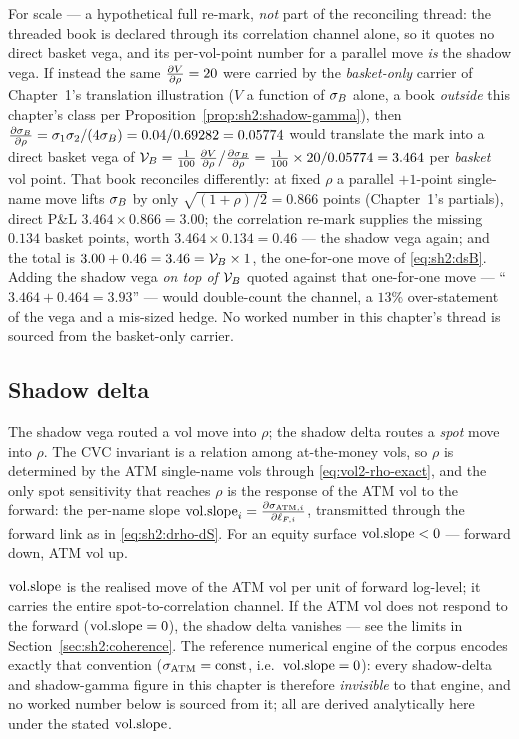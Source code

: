 \begin{example}
For scale --- a hypothetical full re-mark, \emph{not} part of the
reconciling thread: the threaded book is declared through its correlation
channel alone, so it quotes no direct basket vega, and its per-vol-point
number for a parallel move \emph{is} the shadow vega. If instead the same
$\frac{\partial V}{\partial \rho} = 20$ were carried by the \emph{basket-only} carrier of
Chapter~1's translation illustration ($V$ a function of $\sigma_B$ alone, a
book \emph{outside} this chapter's class per
Proposition~\ref{prop:sh2:shadow-gamma}), then
$\frac{\partial \sigma_B}{\partial \rho} = \sigma_1\sigma_2/(4\sigma_B) = 0.04/0.69282 = 0.05774$ would
translate the mark into a direct basket vega of
$\mathcal{V}_B = \tfrac1{100}\,\frac{\partial V}{\partial \rho} \big/ \frac{\partial \sigma_B}{\partial \rho}
     = \tfrac1{100} \times 20 / 0.05774 = 3.464$ per \emph{basket} vol
point. That book reconciles differently: at fixed $\rho$ a parallel
$+1$-point single-name move lifts $\sigma_B$ by only
$\sqrt{(1+\rho)/2} = 0.866$ points (Chapter~1's \stickyrho{} partials),
direct P\&L $3.464 \times 0.866 = 3.00$; the correlation re-mark supplies
the missing $0.134$ basket points, worth $3.464 \times 0.134 = 0.46$ ---
the shadow vega again; and the \stickycvc{} total is
$3.00 + 0.46 = 3.46 = \mathcal{V}_B \times 1$, the one-for-one move of
\eqref{eq:sh2:dsB}. Adding the shadow vega \emph{on top of} $\mathcal{V}_B$ quoted
against that one-for-one move --- ``$3.464 + 0.464 = 3.93$'' --- would
double-count the channel, a $13\%$ over-statement of the vega and a
mis-sized hedge. No worked number in this chapter's thread is sourced
from the basket-only carrier.
\end{example}

\subsection{Shadow delta}\label{sec:sh2:shadow-delta}

The shadow vega routed a vol move into $\rho$; the shadow delta routes a
\emph{spot} move into $\rho$. The CVC invariant is a relation among
at-the-money vols, so $\rho$ is determined by the ATM single-name vols
through \eqref{eq:vol2-rho-exact}, and the only spot sensitivity that
reaches $\rho$ is the response of the ATM vol to the forward: the per-name
slope $\mathrm{vol.slope}_i = \frac{\partial \sigma_{\mathrm{ATM},i}}{\partial \ell_{F,i}}$, transmitted through the
forward link as in \eqref{eq:sh2:drho-dS}. For an equity surface
$\mathrm{vol.slope} < 0$ --- forward down, ATM vol up.

\begin{remark}\label{rem:sh2:slope-input}
$\mathrm{vol.slope}$ is the realised move of the ATM vol per unit of forward
log-level; it carries the entire spot-to-correlation channel. If the ATM
vol does not respond to the forward ($\mathrm{vol.slope} = 0$), the shadow delta
vanishes --- see the limits in Section~\ref{sec:sh2:coherence}. The
reference numerical engine of the corpus encodes exactly that convention
($\sigma_{\mathrm{ATM}} = \text{const}$, i.e.\ $\mathrm{vol.slope} = 0$): every shadow-delta and
shadow-gamma figure in this chapter is therefore \emph{invisible} to that
engine, and no worked number below is sourced from it; all are derived
analytically here under the stated $\mathrm{vol.slope}$.
\end{remark}

